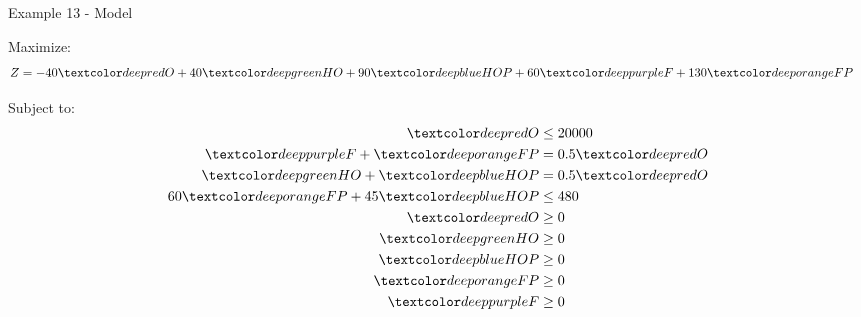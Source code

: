 \begin{frame}{Example 13 - Model}

Maximize:
\begin{align*}
    Z &= -40\colora{O} + 40\colorb{HO} + 90\colorc{HOP} + 60\colord{F} + 130\colore{FP}
\end{align*}

Subject to:
\begin{align*}
    \colora{O} &\le 20000 \\
    \colord{F} + \colore{FP} &= 0.5\colora{O} \\
    \colorb{HO} + \colorc{HOP} &= 0.5\colora{O} \\
  60\colore{FP} + 45\colorc{HOP} &\le 480 \\
    \colora{O} &\ge 0 \\
    \colorb{HO} &\ge 0 \\
    \colorc{HOP} &\ge 0 \\
    \colore{FP} &\ge 0 \\
    \colord{F} &\ge 0
\end{align*}

\end{frame}
